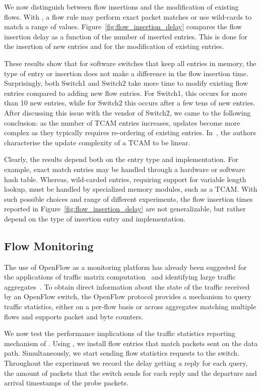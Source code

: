 We now distinguish between flow insertions and the modification of existing
flows.  With \of, a flow rule may perform exact packet matches or use
wild-cards to match a range of values. Figure~\ref{fig:flow_insertion_delay}
compares the flow insertion delay as a function of the number of inserted
entries. This is done for the insertion of new entries and for the modification
of existing entries.

These results show that for software switches that keep all entries in memory,
the type of entry or insertion does not make a difference in the flow insertion
time.  Surprisingly, both Switch1 and Switch2 take more time to modify existing
flow entries compared to adding new flow entries.  For Switch1, this occurs for
more than 10 new entries, while for Switch2 this occurs after a few tens of new
entries.  After discussing this issue with the vendor of Switch2, we came to the
following conclusion: as the number of TCAM entries increases, updates become
more complex as they typically requires re-ordering of existing entries.
In~, the authors characterise the update complexity of a TCAM to
be linear. 

Clearly, the results depend both on the entry type and implementation.  For
example, exact match entries may be handled through a hardware or software hash
table. Whereas, wild-carded entries, requiring support for variable length
lookup, must be handled by specialized memory modules, such as a TCAM\@. With such
possible choices and range of different experiments, the flow insertion times
reported in Figure~\ref{fig:flow_insertion_delay} are not generalizable, but
rather depend on the type of insertion entry and implementation.

\subsection{Flow Monitoring}\label{sec:results-monitoring}

The use of OpenFlow as a monitoring platform has already been suggested for the
applications of traffic matrix computation~ and
identifying large traffic aggregates~. To
obtain direct information about the state of the traffic received by an OpenFlow
switch, the OpenFlow protocol provides a mechanism to query traffic statistics,
either on a per-flow basis or across aggregates matching multiple flows and
supports packet and byte counters. 

We now test the performance implications of the traffic statistics reporting
mechanism of \of. Using \oflops, we install flow entries that match packets sent
on the data path. Simultaneously, we start sending flow statistics requests to
the switch. Throughout the experiment we record the delay getting a reply for
each query, the amount of packets that the switch sends for each reply and the
departure and arrival timestamps of the probe packets.

